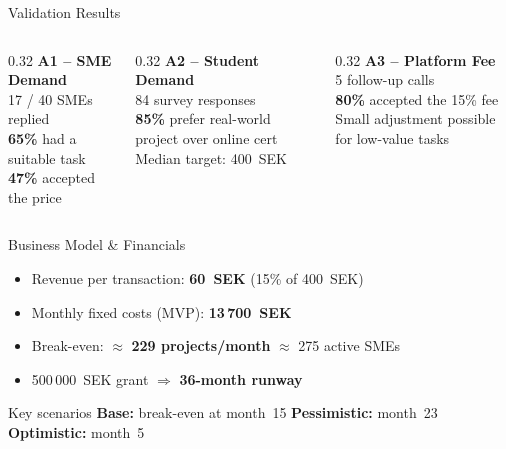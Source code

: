 \documentclass[aspectratio=169]{beamer}
\begin{document}
\begin{frame}{Validation Results}
  \begin{columns}[T]
    \begin{column}{0.32\textwidth}
      \textbf{A1 -- SME Demand}\\[0.3em]
      17 / 40 SMEs replied\\
      \textbf{65\%} had a suitable task\\
      \textbf{47\%} accepted the price
    \end{column}
    \begin{column}{0.32\textwidth}
      \textbf{A2 -- Student Demand}\\[0.3em]
      84 survey responses\\
      \textbf{85\%} prefer real-world project over online cert\\
      Median target: 400~SEK
    \end{column}
    \begin{column}{0.32\textwidth}
      \textbf{A3 -- Platform Fee}\\[0.3em]
      5 follow-up calls\\
      \textbf{80\%} accepted the 15\% fee\\
      Small adjustment possible for low-value tasks
    \end{column}
  \end{columns}
\end{frame}

\begin{frame}{Business Model \& Financials}
  \begin{itemize}
    \item Revenue per transaction: \textbf{60~SEK} (15\% of 400~SEK)
    \item Monthly fixed costs (MVP): \textbf{13\,700~SEK}
    \item Break-even: $\approx$ \textbf{229 projects/month} $\approx$ 275 active SMEs
    \item 500\,000~SEK grant $\Rightarrow$ \textbf{36-month runway}
  \end{itemize}
  \vspace{0.5em}
  \begin{alertblock}{Key scenarios}
    \textbf{Base:} break-even at month~15 \quad
    \textbf{Pessimistic:} month~23 \quad
    \textbf{Optimistic:} month~5
  \end{alertblock}
\end{frame}
\end{document}
